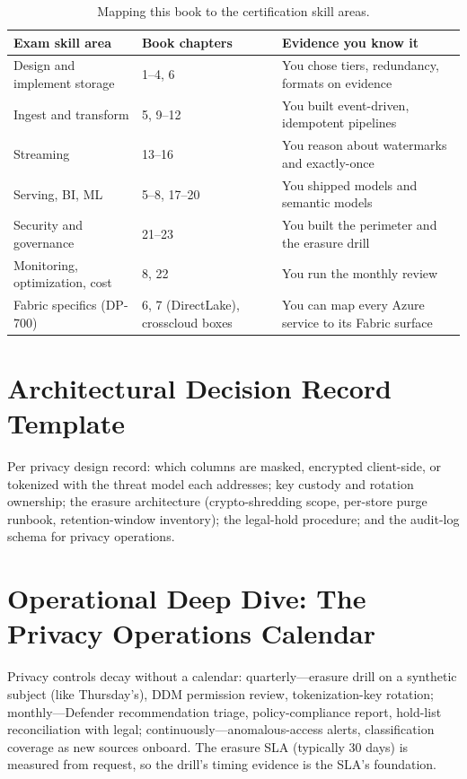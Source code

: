 \begin{table}[H]
\centering
\small
\begin{tabular}{@{}p{4.6cm}p{4.0cm}p{4.2cm}@{}}
\toprule
\textbf{Exam skill area} & \textbf{Book chapters} & \textbf{Evidence you know it} \\
\midrule
Design and implement storage & 1--4, 6 & You chose tiers, redundancy, formats on evidence \\
Ingest and transform & 5, 9--12 & You built event-driven, idempotent pipelines \\
Streaming & 13--16 & You reason about watermarks and exactly-once \\
Serving, BI, ML & 5--8, 17--20 & You shipped models and semantic models \\
Security and governance & 21--23 & You built the perimeter and the erasure drill \\
Monitoring, optimization, cost & 8, 22 & You run the monthly review \\
Fabric specifics (DP-700) & 6, 7 (DirectLake), crosscloud boxes & You can map every Azure service to its Fabric surface \\
\bottomrule
\end{tabular}
\caption{Mapping this book to the certification skill areas.}
\label{tab:ch23-exam-map}
\end{table}

\section{Architectural Decision Record Template}
Per privacy design record: which columns are masked, encrypted client-side, or tokenized with the threat model each addresses; key custody and rotation ownership; the erasure architecture (crypto-shredding scope, per-store purge runbook, retention-window inventory); the legal-hold procedure; and the audit-log schema for privacy operations.

\section{Operational Deep Dive: The Privacy Operations Calendar}
Privacy controls decay without a calendar: quarterly---erasure drill on a synthetic subject (like Thursday's), DDM permission review, tokenization-key rotation; monthly---Defender recommendation triage, policy-compliance report, hold-list reconciliation with legal; continuously---anomalous-access alerts, classification coverage as new sources onboard. The erasure SLA (typically 30 days) is measured from request, so the drill's timing evidence is the SLA's foundation.

